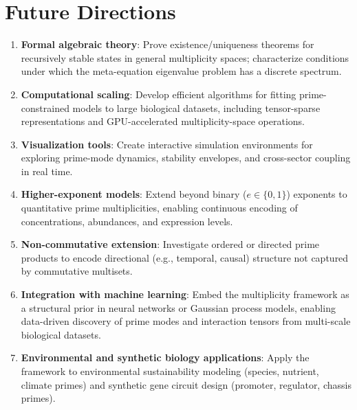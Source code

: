 \documentclass[12pt,letterpaper]{article}
\begin{document}
\newpage
\section{Future Directions}
\label{sec:future}

\begin{enumerate}[leftmargin=*]
  \item \textbf{Formal algebraic theory}: Prove existence/uniqueness theorems
    for recursively stable states in general multiplicity spaces;
    characterize conditions under which the meta-equation eigenvalue problem
    has a discrete spectrum.

  \item \textbf{Computational scaling}: Develop efficient algorithms for
    fitting prime-constrained models to large biological datasets,
    including tensor-sparse representations and GPU-accelerated
    multiplicity-space operations.

  \item \textbf{Visualization tools}: Create interactive simulation
    environments for exploring prime-mode dynamics, stability envelopes,
    and cross-sector coupling in real time.

  \item \textbf{Higher-exponent models}: Extend beyond binary ($e \in \{0,1\}$)
    exponents to quantitative prime multiplicities, enabling continuous
    encoding of concentrations, abundances, and expression levels.

  \item \textbf{Non-commutative extension}: Investigate ordered or directed
    prime products to encode directional (e.g., temporal, causal) structure
    not captured by commutative multisets.

  \item \textbf{Integration with machine learning}: Embed the multiplicity
    framework as a structural prior in neural networks or Gaussian process
    models, enabling data-driven discovery of prime modes and interaction
    tensors from multi-scale biological datasets.

  \item \textbf{Environmental and synthetic biology applications}: Apply the
    framework to environmental sustainability modeling (species,
    nutrient, climate primes) and synthetic gene circuit design
    (promoter, regulator, chassis primes).
\end{enumerate}
\end{document}
